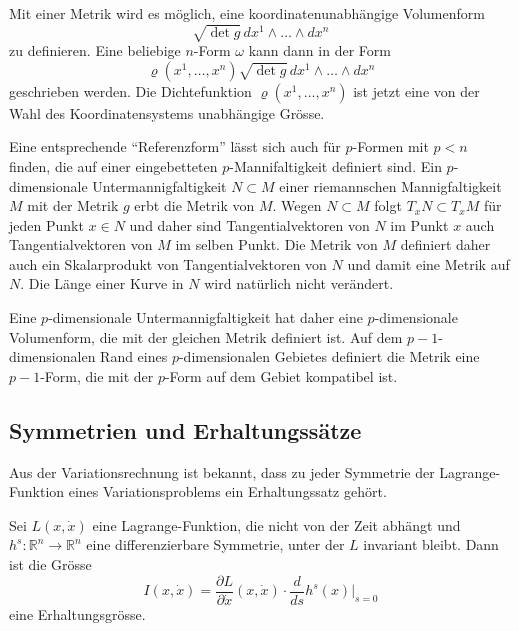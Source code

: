 Mit einer Metrik wird es möglich, eine koordinatenunabhängige Volumenform
\[
\sqrt{\det g}
\,dx^1\wedge\dots\wedge dx^n
\]
zu definieren.
Eine beliebige $n$-Form $\omega$ kann dann in der Form
\[
\varrho(x^1,\dots,x^n)
\sqrt{\det g}
\,dx^1\wedge \dots \wedge dx^n
\]
geschrieben werden.
Die Dichtefunktion $\varrho(x^1,\dots,x^n)$ ist jetzt eine von der
Wahl des Koordinatensystems unabhängige Grösse.

Eine entsprechende ``Referenzform'' lässt sich auch für $p$-Formen mit
$p<n$ finden, die auf einer eingebetteten $p$-Mannifaltigkeit
definiert sind.
Ein $p$-dimensionale Untermannigfaltigkeit $N\subset M$ einer
riemannschen Mannigfaltigkeit $M$ mit der Metrik $g$ erbt die Metrik
von $M$.
Wegen $N\subset M$ folgt $T_xN\subset T_xM$ für jeden Punkt $x\in N$
und daher sind Tangentialvektoren von $N$ im Punkt $x$ auch
Tangentialvektoren von $M$ im selben Punkt.
Die Metrik von $M$ definiert daher auch ein Skalarprodukt von
Tangentialvektoren von $N$ und damit eine Metrik auf $N$.
Die Länge einer Kurve in $N$ wird natürlich nicht verändert.

Eine $p$-dimensionale Untermannigfaltigkeit hat daher eine $p$-dimensionale
Volumenform, die mit der gleichen Metrik definiert ist.
Auf dem $p-1$-dimensionalen Rand eines $p$-dimensionalen Gebietes definiert
die Metrik eine $p-1$-Form, die mit der $p$-Form auf dem Gebiet kompatibel
ist.

%
%
\subsection{Symmetrien und Erhaltungssätze
\label{buch:zusammenhang:divergenz:subsection:noether}}
Aus der Variationsrechnung \cite[Abschnitt 10.2]{buch:seminarvariation}
ist bekannt, dass zu jeder Symmetrie der Lagrange-Funktion eines
Variationsproblems ein Erhaltungssatz gehört.

\begin{satz}
\label{buch:symmetrien:noether:satz:noether}
%
Sei $L(x,\dot{x})$ eine Lagrange-Funktion, die nicht von der Zeit
abhängt und $h^s\colon\mathbb{R}^n\to\mathbb{R}^n$ eine differenzierbare
Symmetrie, unter der $L$ invariant bleibt.
Dann ist die Grösse
\begin{equation}
I(x,\dot{x})
=
\frac{\partial L}{\partial\dot{x}} (x,\dot{x})
\cdot 
\frac{d}{ds} h^s(x)\bigg|_{s=0}
\end{equation}
eine Erhaltungsgrösse.
\end{satz}

